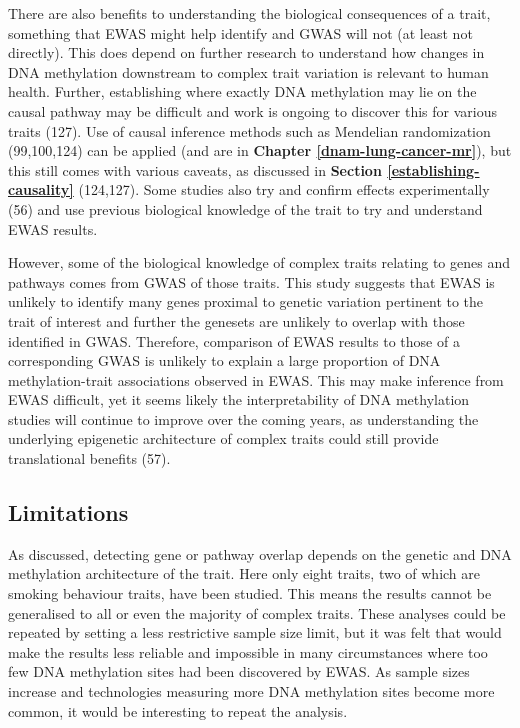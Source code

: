 \documentclass[11pt,oneside]{bristolthesis}
\begin{document}
There are also benefits to understanding the biological consequences of a trait, something that EWAS might help identify and GWAS will not (at least not directly). This does depend on further research to understand how changes in DNA methylation downstream to complex trait variation is relevant to human health. Further, establishing where exactly DNA methylation may lie on the causal pathway may be difficult and work is ongoing to discover this for various traits (127). Use of causal inference methods such as Mendelian randomization (99,100,124) can be applied (and are in \textbf{Chapter \ref{dnam-lung-cancer-mr}}), but this still comes with various caveats, as discussed in \textbf{Section \ref{establishing-causality}} (124,127). Some studies also try and confirm effects experimentally (56) and use previous biological knowledge of the trait to try and understand EWAS results.

However, some of the biological knowledge of complex traits relating to genes and pathways comes from GWAS of those traits. This study suggests that EWAS is unlikely to identify many genes proximal to genetic variation pertinent to the trait of interest and further the genesets are unlikely to overlap with those identified in GWAS. Therefore, comparison of EWAS results to those of a corresponding GWAS is unlikely to explain a large proportion of DNA methylation-trait associations observed in EWAS. This may make inference from EWAS difficult, yet it seems likely the interpretability of DNA methylation studies will continue to improve over the coming years, as understanding the underlying epigenetic architecture of complex traits could still provide translational benefits (57).

\hypertarget{limitations-06}{%
\subsection{Limitations}\label{limitations-06}}

As discussed, detecting gene or pathway overlap depends on the genetic and DNA methylation architecture of the trait. Here only eight traits, two of which are smoking behaviour traits, have been studied. This means the results cannot be generalised to all or even the majority of complex traits. These analyses could be repeated by setting a less restrictive sample size limit, but it was felt that would make the results less reliable and impossible in many circumstances where too few DNA methylation sites had been discovered by EWAS. As sample sizes increase and technologies measuring more DNA methylation sites become more common, it would be interesting to repeat the analysis.
\end{document}
